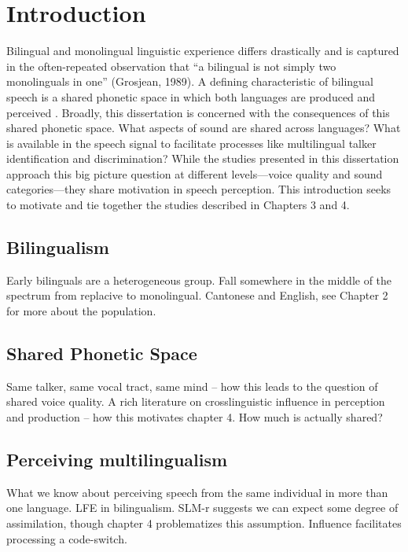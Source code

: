 
\chapter{Introduction}
\label{ch:Introduction}

Bilingual and monolingual linguistic experience differs drastically and is captured in the often-repeated observation that ``a bilingual is not simply two monolinguals in one'' (Grosjean, 1989). A defining characteristic of bilingual speech is a shared phonetic space in which both languages are produced and perceived \citep{}. Broadly, this dissertation is concerned with the consequences of this shared phonetic space. What aspects of sound are shared across languages? What is available in the speech signal to facilitate processes like multilingual talker identification and discrimination? While the studies presented in this dissertation approach this big picture question at different levels---voice quality and sound categories---they share motivation in speech perception. This introduction seeks to motivate and tie together the studies described in Chapters 3 and 4. 

\section{Bilingualism}
Early bilinguals are a heterogeneous group.
Fall somewhere in the middle of the spectrum from replacive to monolingual.
Cantonese and English, see Chapter 2 for more about the population.

\section{Shared Phonetic Space} %
Same talker, same vocal tract, same mind -- how this leads to the question of shared voice quality.
A rich literature on crosslinguistic influence in perception and production -- how this motivates chapter 4.
How much is actually shared?

\section{Perceiving multilingualism}
What we know about perceiving speech from the same individual in more than one language.
LFE in bilingualism.
SLM-r suggests we can expect some degree of assimilation, though chapter 4 problematizes this assumption.
Influence facilitates processing a code-switch.

